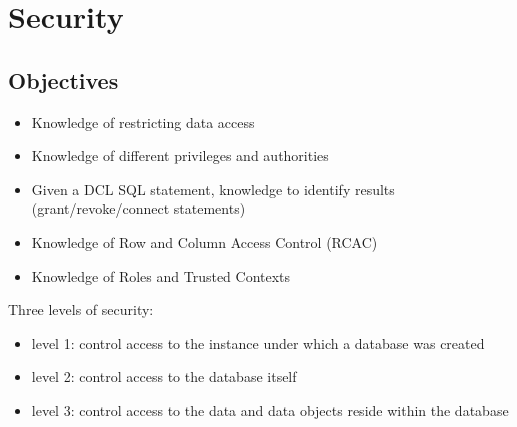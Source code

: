 \documentclass{article}
\begin{document}
\newpage

\section{Security}
\label{security}

\subsection{Objectives}
\begin{itemize}
\item Knowledge of restricting data access
\item Knowledge of different privileges and authorities
\item Given a DCL SQL statement, knowledge to identify results (grant/revoke/connect statements)
\item Knowledge of Row and Column Access Control (RCAC)
\item Knowledge of Roles and Trusted Contexts
\end{itemize}

Three levels of security:
\begin{itemize}
\item level 1: control access to the instance under which a database was created
\item level 2: control access to the database itself
\item level 3: control access to the data and data objects reside within the database
\end{itemize}
\end{document}
